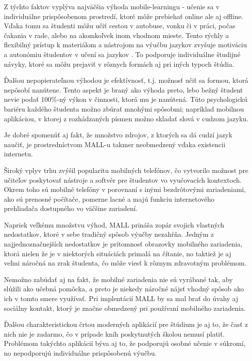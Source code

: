 \documentclass[10pt,oneside,slovak,a4paper]{article}
\begin{document}
Z týchto faktov vyplýva najväčšia výhoda mobile-learningu - učenie sa v individuálne prispôsobenom prostredí, ktoré môže prebiehať online ale aj offline. Vďaka tomu sa študenti môžu učiť cestou v autobuse, vonku či v práci, počas čakania v rade, alebo na akomkoľvek inom vhodnom mieste. Tento rýchly a flexibilný prístup k materiálom a nástrojom na výučbu jazykov zvyšuje motiváciu a autonómiu študentov v učení sa jazykov \cite{Kim2012}. To podporuje individuálne študijné návyky, ktoré sa môžu prejaviť v rôznych formách aj pri iných typoch štúdia.

Ďalšou nepopierateľnou výhodou je efektívnosť, t.j. možnosť učiť sa formou, ktorá nepôsobí nanútene. Tento aspekt je braný ako výhoda preto, lebo bežný študent nevie podať 100\%-ný výkon v činnosti, ktorá mu je nanútená. Túto psychologickú bariéru každého študenta možno zbúrať mnohými spôsobmi; napríklad mobilnou aplikáciou, v ktorej z rozhádzaných písmen možno skladať slová v cudzom jazyku.

Je dobré spomenúť aj fakt, že množstvo zdrojov, z ktorých sa dá cudzí jazyk naučiť, je prostredníctvom MALL-u takmer neobmedzený vďaka existencii internetu.

Široký vplyv trhu zvýšil popularitu mobilných telefónov, čo vytvorilo možnost pre učiteľov poskytovať nástroje a softvér pre študentov vo vyučovacích kontextoch\cite{Miangah2012}. Okrem toho sú mobilné telefóny v porovnaní s inými bezdrôtovými zariadeniami, ako sú prenosné počítače, pomerne lacné a majú funkciu internetového prehliadača dostupného vo väčšine zariadení\cite{Miangah2012}.

Napriek veľkému množstvu výhod, MALL prináša zopár svojich vlastných nedostatkov, ktoré v sebe tradičný spôsob výučby nezahŕňa. Jedným z najjednoznačnejších nedostatkov je prítomnosť obrazovky mobilného zariadenia, ktorá nielen že je v niektorých situáciách primalá na čítanie, no taktiež je aj veľmi náročná na zrak študenta, čo môže viesť k rôznym zdravotným problémom.

Nemožno zabúdať aj na fakt, že mobilné zariadenia nie sú vyrábané tak, aby slúžili ako učebná pomôcka, a preto je niekedy náročné nájsť vhodný spôsob ako ich v tomto smere využívať. Pri implentácií MALL by sa mal brať do úvahy aj sociálny kontakt, ktorý je značne obmedzený pri používaní mobilného zariadenia.

Ďalšou charakteristickou črtou moderných aplikácií pre štúdium je aj to, že časť z nich nie je zadarmo, čo v prípade kníh poskytnutých školou nemusí platiť. Problémom takýchto aplikácií býva aj to, že podporujú osobné učenie v súkromí, no nepodporujú individuálne prispôsobenú výučbu.
\end{document}
